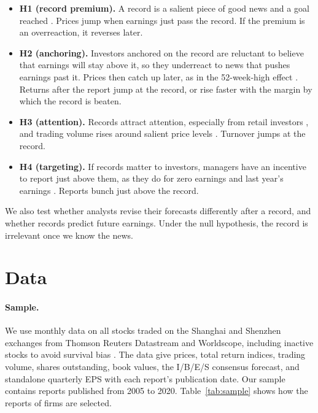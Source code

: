\documentclass[11pt]{article}
\begin{document}
\begin{itemize}
\item \textbf{H1 (record premium).} A record is a salient piece of good news and a goal reached
\citep{heath1999,bordalo2012}. Prices jump when earnings just pass the record. If the premium is an overreaction, it
reverses later.
\item \textbf{H2 (anchoring).} Investors anchored on the record are reluctant to believe that earnings will stay above
it, so they underreact to news that pushes earnings past it. Prices then catch up later, as in the 52-week-high
effect \citep{george2004,jang2021}. Returns after the report jump at the record, or rise faster with the margin by
which the record is beaten.
\item \textbf{H3 (attention).} Records attract attention, especially from retail investors \citep{barber2008,seasholes2007}, and
trading volume rises around salient price levels \citep{huddart2009}. Turnover jumps at the record.
\item \textbf{H4 (targeting).} If records matter to investors, managers have an incentive to report just above them,
as they do for zero earnings and last year's earnings \citep{burgstahler1997,degeorge1999,myers2007}. Reports bunch
just above the record.
\end{itemize}

\noindent We also test whether analysts revise their forecasts differently after a record, and whether records predict
future earnings. Under the null hypothesis, the record is irrelevant once we know the news.

\section{Data}

\paragraph{Sample.} We use monthly data on all stocks traded on the Shanghai and Shenzhen exchanges from Thomson
Reuters Datastream and Worldscope, including inactive stocks to avoid survival bias \citep{shumway1997}. The data give
prices, total return indices, trading volume, shares outstanding, book values, the I/B/E/S consensus forecast, and
standalone quarterly EPS with each report's publication date. Our sample contains reports published from 2005 to 2020.
Table~\ref{tab:sample} shows how the \NReports{} reports of \NFirms{} firms are selected.
\end{document}

